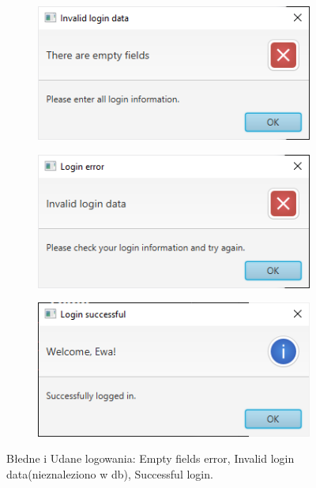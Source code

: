 \begin{figure}[H]
    \centering
    \begin{subfigure}{0.7\linewidth}
        \centering
        \includegraphics[width=.6\linewidth]{figures/FailedLogin1.png}
    \end{subfigure}
    \begin{subfigure}{0.7\linewidth}
        \centering
        \subcaption{\label{subfigure_a}}
        \includegraphics[width=.6\linewidth]{figures/FailedLoginData.png}
        \subcaption{\label{subfigure_b}}
    \end{subfigure}
    \begin{subfigure}{0.7\linewidth}
        \centering
        \includegraphics[width=.6\linewidth]{figures/SuccesLogin.png}
        \subcaption{\label{subfigure_c}}
    \end{subfigure}
    \caption{ Błedne i Udane logowania: \protect{} Empty fields error, \protect{} Invalid login data(nieznaleziono w db), \protect{} Successful login. \label{fig:subcaption}}
\end{figure}
